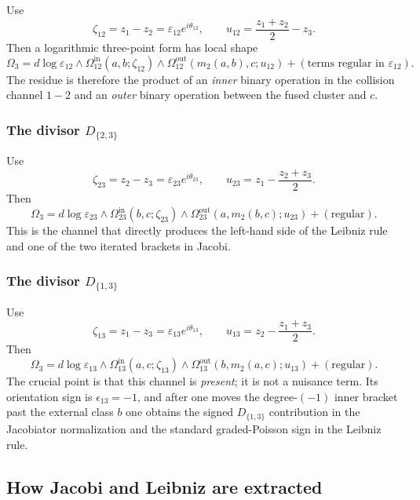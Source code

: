 Use
\[
\zeta_{12}=z_1-z_2=\varepsilon_{12}e^{i\theta_{12}},
\qquad
u_{12}=\frac{z_1+z_2}{2}-z_3.
\]
Then a logarithmic three-point form has local shape
\begin{equation}
\label{eq:local-D12}
\Omega_3
=
d\log\varepsilon_{12}\wedge
\Omega_{12}^{\mathrm{in}}(a,b;\zeta_{12})
\wedge
\Omega_{12}^{\mathrm{out}}(m_2(a,b),c;u_{12})
+
(\text{terms regular in }\varepsilon_{12}).
\end{equation}
The residue is therefore the product of an \emph{inner} binary operation in the
collision channel $1\!-\!2$ and an \emph{outer} binary operation between the fused
cluster and $c$.

\subsubsection*{The divisor $D_{\{2,3\}}$}

Use
\[
\zeta_{23}=z_2-z_3=\varepsilon_{23}e^{i\theta_{23}},
\qquad
u_{23}=z_1-\frac{z_2+z_3}{2}.
\]
Then
\begin{equation}
\label{eq:local-D23}
\Omega_3
=
d\log\varepsilon_{23}\wedge
\Omega_{23}^{\mathrm{in}}(b,c;\zeta_{23})
\wedge
\Omega_{23}^{\mathrm{out}}(a,m_2(b,c);u_{23})
+
(\text{regular}).
\end{equation}
This is the channel that directly produces the left-hand side of the Leibniz rule and
one of the two iterated brackets in Jacobi.

\subsubsection*{The divisor $D_{\{1,3\}}$}

Use
\[
\zeta_{13}=z_1-z_3=\varepsilon_{13}e^{i\theta_{13}},
\qquad
u_{13}=z_2-\frac{z_1+z_3}{2}.
\]
Then
\begin{equation}
\label{eq:local-D13}
\Omega_3
=
d\log\varepsilon_{13}\wedge
\Omega_{13}^{\mathrm{in}}(a,c;\zeta_{13})
\wedge
\Omega_{13}^{\mathrm{out}}(b,m_2(a,c);u_{13})
+
(\text{regular}).
\end{equation}
The crucial point is that this channel is \emph{present}; it is not a
nuisance term.  Its orientation sign is $\epsilon_{13}=-1$, and after
one moves the degree-$(-1)$ inner bracket past the external class $b$
one obtains the signed \(D_{\{1,3\}}\) contribution in the Jacobiator
normalization and the standard graded-Poisson sign in the Leibniz rule.

\subsection{How Jacobi and Leibniz are extracted}

